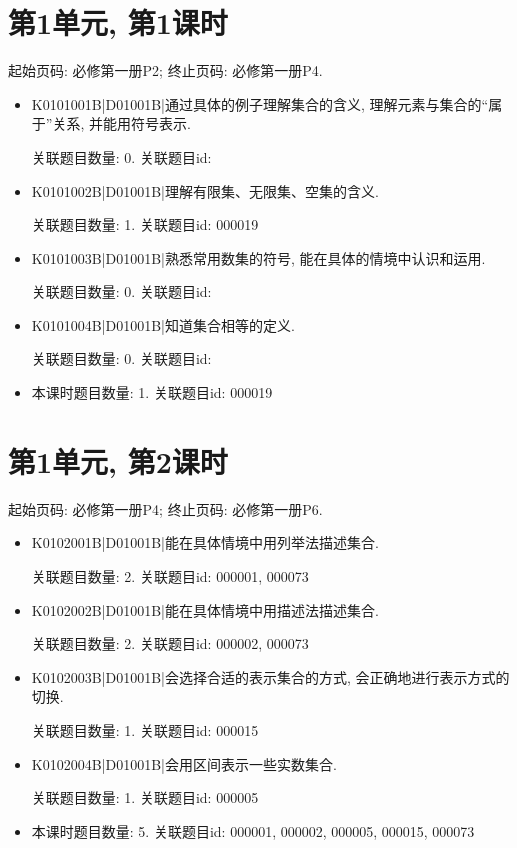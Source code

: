 \section*{第1单元, 第1课时}
起始页码: 必修第一册P2; 终止页码: 必修第一册P4.
\begin{itemize}
\item K0101001B|D01001B|通过具体的例子理解集合的含义, 理解元素与集合的``属于''关系, 并能用符号表示.

关联题目数量: 0. 关联题目id: 

\item K0101002B|D01001B|理解有限集、无限集、空集的含义.

关联题目数量: 1. 关联题目id: 000019

\item K0101003B|D01001B|熟悉常用数集的符号, 能在具体的情境中认识和运用.

关联题目数量: 0. 关联题目id: 

\item K0101004B|D01001B|知道集合相等的定义.

关联题目数量: 0. 关联题目id: 

\item 本课时题目数量: 1. 关联题目id: 000019

\end{itemize}

\section*{第1单元, 第2课时}
起始页码: 必修第一册P4; 终止页码: 必修第一册P6.
\begin{itemize}
\item K0102001B|D01001B|能在具体情境中用列举法描述集合.

关联题目数量: 2. 关联题目id: 000001, 000073

\item K0102002B|D01001B|能在具体情境中用描述法描述集合.

关联题目数量: 2. 关联题目id: 000002, 000073

\item K0102003B|D01001B|会选择合适的表示集合的方式, 会正确地进行表示方式的切换.

关联题目数量: 1. 关联题目id: 000015

\item K0102004B|D01001B|会用区间表示一些实数集合.

关联题目数量: 1. 关联题目id: 000005

\item 本课时题目数量: 5. 关联题目id: 000001, 000002, 000005, 000015, 000073

\end{itemize}

